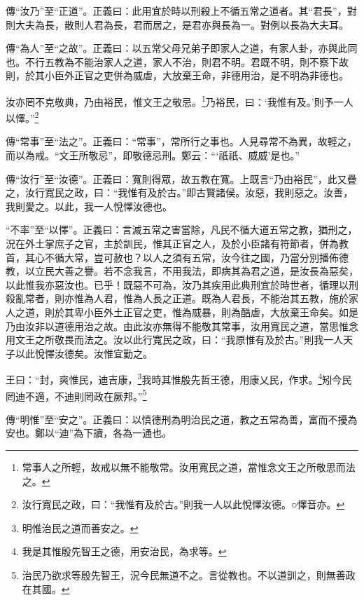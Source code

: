 {\noindent\zhuan{}\fzbyks 傳“汝乃”至“正道”。正義曰：此用宜於時以刑殺上不循五常之道者。其“君長”，對則大夫為長，散則人君為長，君而居之，是君亦與長為一。對例以長為大夫耳。 \par}

{\noindent\zhuan{}\fzbyks 傳“為人”至“之故”。正義曰：以五常父母兄弟子即家人之道，有家人卦，亦與此同也。不行五教為不能治家人之道，家人不治，則君不明。君既不明，則不察下故則，於其小臣外正官之吏併為威虐，大放棄王命，非德用治，是不明為非德也。 \par}

汝亦罔不克敬典，乃由裕民，惟文王之敬忌。\footnote{常事人之所輕，故戒以無不能敬常。汝用寬民之道，當惟念文王之所敬思而法之。}乃裕民，曰：‘我惟有及。’則予一人以懌。”\footnote{汝行寬民之政，曰：“我惟有及於古。”則我一人以此悅懌汝德。○懌音亦。}

{\noindent\zhuan{}\fzbyks 傳“常事”至“法之”。正義曰：“常事”，常所行之事也。人見尋常不為異，故輕之，而以為戒。“文王所敬忌”，即敬德忌刑。鄭云：“‘祇祇、威威’是也。” \par}

{\noindent\zhuan{}\fzbyks 傳“汝行”至“汝德”。正義曰：寬則得眾，故五教在寬。上既言“乃由裕民”，此又疊之，汝行寬民之政，曰：“我惟有及於古。”即古賢諸侯。汝惡，我則惡之。汝善，我則愛之。以此，我一人悅懌汝德也。 \par}

{\noindent\shu{}\fzkt “不率”至“以懌”。正義曰：言滅五常之害當除，凡民不循大道五常之教，猶刑之，況在外土掌庶子之官，主於訓民，惟其正官之人，及於小臣諸有符節者，併為教首，其心不循大常，豈可赦也？以人之須有五常，汝今往之國，乃當分別播佈德教，以立民大善之譽。若不念我言，不用我法，即病其為君之道，是汝長為惡矣，以此惟我亦惡汝也。已乎！既惡不可為，汝乃其疾用此典刑宜於時世者，循理以刑殺亂常者，則亦惟為人君，惟為人長之正道。既為人君長，不能治其五教，施於家人之道，則於其卑小臣外土正官之吏，惟為威暴，則為酷虐，大放棄王命矣。如是乃由汝非以道德用治之故。由此汝亦無得不能敬其常事，汝用寬民之道，當思惟念用文王之所敬畏而法之。汝以此行寬民之政，曰：“我原惟有及於古。”則我一人天子以此悅懌汝德矣。汝惟宜勤之。 \par}

王曰：“封，爽惟民，迪吉康，\footnote{明惟治民之道而善安之。}我時其惟殷先哲王德，用康乂民，作求。\footnote{我是其惟殷先智王之德，用安治民，為求等。}矧今民罔迪不適，不迪則罔政在厥邦。”\footnote{治民乃欲求等殷先智王，況今民無道不之。言從教也。不以道訓之，則無善政在其國。}


{\noindent\zhuan{}\fzbyks 傳“明惟”至“安之”。正義曰：以慎德刑為明治民之道，教之五常為善，富而不擾為安也。鄭以“迪”為下讀，各為一通也。 \par}

